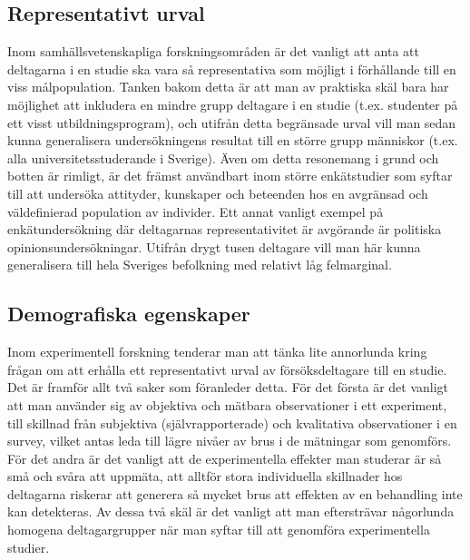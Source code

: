 \documentclass[
]{book}
\begin{document}
\hypertarget{sub07.2.1}{%
\subsection{Representativt urval}\label{sub07.2.1}}

Inom samhällsvetenskapliga forskningsområden är det vanligt att anta att deltagarna i en studie ska vara så representativa som möjligt i förhållande till en viss målpopulation. Tanken bakom detta är att man av praktiska skäl bara har möjlighet att inkludera en mindre grupp deltagare i en studie (t.ex. studenter på ett visst utbildningsprogram), och utifrån detta begränsade urval vill man sedan kunna generalisera undersökningens resultat till en större grupp människor (t.ex. alla universitetsstuderande i Sverige). Även om detta resonemang i grund och botten är rimligt, är det främst användbart inom större enkätstudier som syftar till att undersöka attityder, kunskaper och beteenden hos en avgränsad och väldefinierad population av individer. Ett annat vanligt exempel på enkätundersökning där deltagarnas representativitet är avgörande är politiska opinionsundersökningar. Utifrån drygt tusen deltagare vill man här kunna generalisera till hela Sveriges befolkning med relativt låg felmarginal.

\hypertarget{sub07.2.2}{%
\subsection{Demografiska egenskaper}\label{sub07.2.2}}

Inom experimentell forskning tenderar man att tänka lite annorlunda kring frågan om att erhålla ett representativt urval av försöksdeltagare till en studie. Det är framför allt två saker som föranleder detta. För det första är det vanligt att man använder sig av objektiva och mätbara observationer i ett experiment, till skillnad från subjektiva (självrapporterade) och kvalitativa observationer i en survey, vilket antas leda till lägre nivåer av brus i de mätningar som genomförs. För det andra är det vanligt att de experimentella effekter man studerar är så små och svåra att uppmäta, att alltför stora individuella skillnader hos deltagarna riskerar att generera så mycket brus att effekten av en behandling inte kan detekteras. Av dessa två skäl är det vanligt att man eftersträvar någorlunda homogena deltagargrupper när man syftar till att genomföra experimentella studier.
\end{document}
